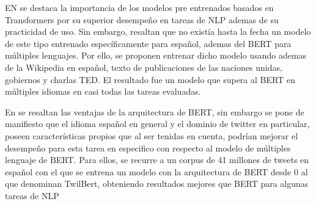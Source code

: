 EN \cite{canete2020spanish} se destaca la importancia de los modelos pre entrenados basados en Transformers por su superior desempeño en tareas de NLP ademas de su practicidad de uso. Sin embargo, resaltan que no existía hasta la fecha un modelo de este tipo entrenado específicamente para español, ademas del BERT para múltiples lenguajes. Por ello, se proponen entrenar dicho modelo usando ademas de la Wikipedia en español, texto de publicaciones de las naciones unidas, gobiernos y charlas TED. El resultado fue un modelo que supera al BERT en múltiples idiomas en casi todas las tareas evaluadas.

En \cite{gonzalez2021twilbert} se resaltan las ventajas de la arquitectura de BERT, sin embargo se pone de manifiesto que el idioma español en general y el dominio de twitter en particular, poseen características propios que al ser tenidas en cuenta, podrían mejorar el desempeño para esta tarea en especifico con respecto al modelo de múltiples lenguaje de BERT. Para ellos, se recurre a un corpus de 41 millones de tweets en español con el que se entrena un modelo con la arquitectura de BERT desde 0 al que denominan TwilBert, obteniendo resultados mejores que BERT para algunas tareas de NLP







